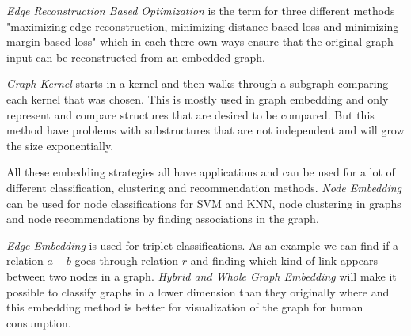 \textit{Edge Reconstruction Based Optimization} is the term for three different methods "maximizing edge reconstruction, minimizing distance-based loss and minimizing margin-based loss" which in each there own ways ensure that the original graph input can be reconstructed from an embedded graph\cite{8294302}.

\textit{Graph Kernel} starts in a kernel and then walks through a subgraph comparing each kernel that was chosen. This is mostly used in graph embedding and only represent and compare structures that are desired to be compared. But this method have problems with substructures that are not independent and will grow the size exponentially\cite{8294302}.

All these embedding strategies all have applications and can be used for a lot of different classification, clustering and recommendation methods. \textit{Node Embedding} can be used for node classifications for SVM and KNN, node clustering in graphs and node recommendations by finding associations in the graph\cite{8294302}. 

\textit{Edge Embedding} is used for triplet classifications. As an example we can find if a relation $a-b$ goes through relation $r$ and finding which kind of link appears between two nodes in a graph. \textit{Hybrid and Whole Graph Embedding} will make it possible to classify graphs in a lower dimension than they originally where and this embedding method is better for visualization of the graph for human consumption\cite{8294302}.
